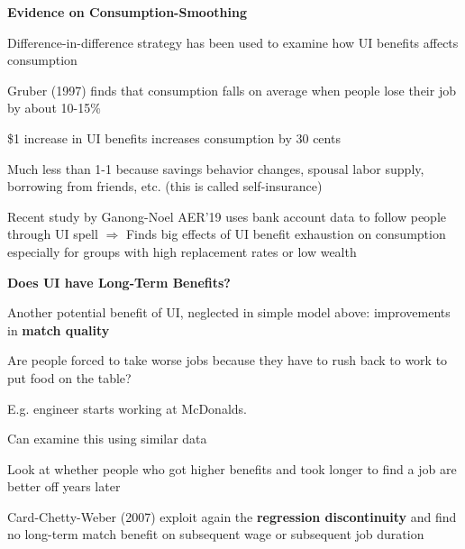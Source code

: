 \documentclass[landscape]{slides}
\begin{document}
\begin{slide}
\begin{center}
{\bf Evidence on Consumption-Smoothing}
\end{center}

Difference-in-difference strategy has been used to examine how UI benefits affects consumption

Gruber (1997) finds that consumption falls on average when people lose their job by about 10-15\%

\$1 increase in UI benefits increases consumption by 30 cents

Much less than 1-1 because savings behavior changes, spousal labor supply, borrowing from friends, etc.
(this is called self-insurance)

Recent study by Ganong-Noel AER'19 uses bank account data to follow people through UI spell
$\Rightarrow$ Finds big effects of UI benefit exhaustion on consumption especially for groups with high replacement rates or low wealth

\end{slide}

\begin{slide}

\end{slide}


\begin{slide}
\begin{center}
{\bf Does UI have Long-Term Benefits?}
\end{center}

Another potential benefit of UI, neglected in simple model above: improvements in \textbf{match quality}

Are people forced to take worse jobs because they have to rush back to work to put food on the table?

E.g. engineer starts working at McDonalds.

Can examine this using similar data

Look at whether people who got higher benefits and took longer to find a job are better off years later

Card-Chetty-Weber (2007) exploit again the \textbf{regression discontinuity} and find no long-term match benefit
on subsequent wage or subsequent job duration
\end{slide}

\begin{slide}

\end{slide}
\end{document}
